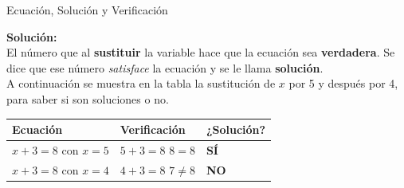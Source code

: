 \documentclass[12pt, letterpaper]{article}
\begin{document}
\begin{concepto}{Ecuación, Solución y Verificación}
		
		\textbf{Solución:}\\
		
		El número que al \textbf{sustituir} la variable hace que la
		ecuación sea \textbf{verdadera}. Se dice que ese número \textit{satisface} la ecuación y se le llama \textbf{solución}.\\
		
		A continuación se muestra en la tabla la sustitución de $x$ por 5 y después por 4, para saber si son soluciones o no.
		
		\vspace{0.3cm}
		\begin{center}
			\renewcommand{\arraystretch}{1.5}
			\begin{tabular}{|m{3cm}|m{4.5cm}|m{2.5cm}|}
				\hline
				\rowcolor{valblue!20}
				\textbf{Ecuación} & \textbf{Verificación} & \textbf{¿Solución?} \\
				\hline
				$x + 3 = 8$ \newline con $x = 5$ &
				$5 + 3 = 8$ \newline $8 = 8$ \checkmark &
				\textcolor{valgreen}{\textbf{SÍ}} \\
				\hline
				$x + 3 = 8$ \newline con $x = 4$ &
				$4 + 3 = 8$ \newline $7 \neq 8$ \texttimes &
				\textcolor{valred}{\textbf{NO}} \\
				\hline
			\end{tabular}
		\end{center}
	\end{concepto}
	\newpage
	
\end{document}
